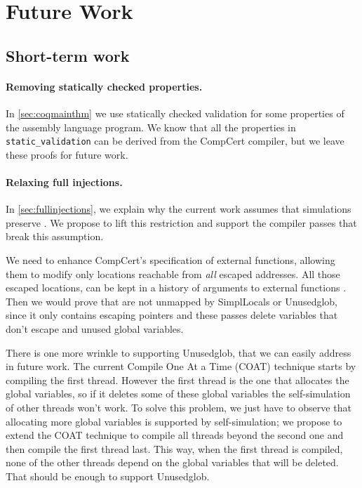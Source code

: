 \section{Future Work}\label{ch:futurework}




\subsection{Short-term work}\label{sec:shortfuture}

\paragraph{Removing statically checked properties.}  In \autoref{sec:coqmainthm} we use statically checked validation for some properties of the assembly language program. We know that all the properties in \lstinline{static_validation} can be derived from the CompCert compiler, but we leave these proofs for future work. 

\paragraph{Relaxing full injections.} In \autoref{sec:fullinjections}, we explain why the current work assumes that simulations preserve . We propose to lift this restriction and support the compiler passes that break this assumption. 

We need to enhance CompCert's specification of external functions, allowing them to modify only locations reachable from \emph{all} escaped addresses. All those escaped locations, can be kept in a history of arguments to external functions . Then we would prove that  are not unmapped by SimplLocals or Unusedglob, since it only contains escaping pointers and these passes delete variables that don't escape and unused global variables. 

There is one more wrinkle to supporting Unusedglob, that we can easily address in future work. The current Compile One At a Time (COAT) technique starts by compiling the first thread. However the first thread is the one that allocates the global variables, so if it deletes some of these global variables the self-simulation of other threads won't work. To solve this problem, we just have to observe that allocating more global variables is supported by self-simulation; we propose to extend the COAT technique to compile all threads beyond the second one and then compile the first thread last. This way, when the first thread is compiled, none of the other threads depend on the global variables that will be deleted. That should be enough to support Unusedglob.

